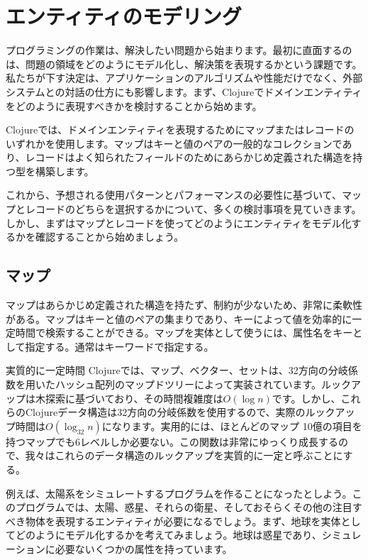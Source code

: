 \section{エンティティのモデリング}


プログラミングの作業は、解決したい問題から始まります。最初に直面するのは、問題の領域をどのようにモデル化し、解決策を表現するかという課題です。私たちが下す決定は、アプリケーションのアルゴリズムや性能だけでなく、外部システムとの対話の仕方にも影響します。まず、Clojureでドメインエンティティをどのように表現すべきかを検討することから始めます。

Clojureでは、ドメインエンティティを表現するためにマップまたはレコードのいずれかを使用します。マップはキーと値のペアの一般的なコレクションであり、レコードはよく知られたフィールドのためにあらかじめ定義された構造を持つ型を構築します。

これから、予想される使用パターンとパフォーマンスの必要性に基づいて、マップとレコードのどちらを選択するかについて、多くの検討事項を見ていきます。しかし、まずはマップとレコードを使ってどのようにエンティティをモデル化するかを確認することから始めましょう。


\subsection{マップ}

マップはあらかじめ定義された構造を持たず、制約が少ないため、非常に柔軟性がある。マップはキーと値のペアの集まりであり、キーによって値を効率的に一定時間で検索することができる。マップを実体として使うには、属性名をキーとして指定する。通常はキーワードで指定する。

\begin{itembox}[l]{実質的に一定時間}
Clojureでは、マップ、ベクター、セットは、32方向の分岐係数を用いたハッシュ配列のマップドツリーによって実装されています。ルックアップは木探索に基づいており、その時間複雑度は$O(\log n)$です。しかし、これらのClojureデータ構造は32方向の分岐係数を使用するので、実際のルックアップ時間は$O(\log _{32} n)$になります。実用的には、ほとんどのマップ 10億の項目を持つマップでも6レベルしか必要ない。この関数は非常にゆっくり成長するので、我々はこれらのデータ構造のルックアップを実質的に一定と呼ぶことにする。
\end{itembox}


例えば、太陽系をシミュレートするプログラムを作ることになったとしよう。このプログラムでは、太陽、惑星、それらの衛星、そしておそらくその他の注目すべき物体を表現するエンティティが必要になるでしょう。まず、地球を実体としてどのようにモデル化するかを考えてみましょう。地球は惑星であり、シミュレーションに必要ないくつかの属性を持っています。

